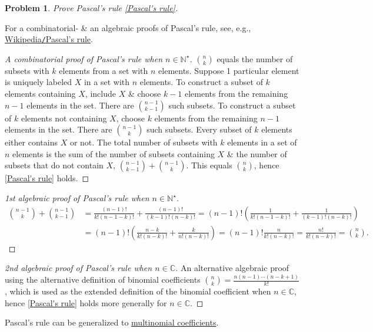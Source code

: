 \documentclass{article}
\newtheorem{problem}{Problem}
\begin{document}
\begin{problem}
	Prove Pascal's rule \eqref{Pascal's rule}.
\end{problem}
For a combinatorial- \& an algebraic proofs of Pascal's rule, see, e.g., \href{https://en.wikipedia.org/wiki/Pascal%27s_rule}{Wikipedia{\tt/}Pascal's rule}.

\begin{proof}[A combinatorial proof of Pascal's rule when $n\in\mathbb{N}^\star$]
	$\binom{n}{k}$ equals the number of subsets with $k$ elements from a set with $n$ elements. Suppose 1 particular element is uniquely labeled $X$ in a set with $n$ elements. To construct a subset of $k$ elements containing $X$, include $X$ \& choose $k - 1$ elements from the remaining $n - 1$ elements in the set. There are $\binom{n - 1}{k - 1}$ such subsets. To construct a subset of $k$ elements not containing $X$, choose $k$ elements from the remaining $n - 1$ elements in the set. There are $\binom{n - 1}{k}$ such subsets. Every subset of $k$ elements either contains $X$ or not. The total number of subsets with $k$ elements in a set of $n$ elements is the sum of the number of subsets containing $X$ \& the number of subsets that do not contain $X$, $\binom{n - 1}{k - 1} + \binom{n - 1}{k}$. This equals $\binom{n}{k}$, hence \eqref{Pascal's rule} holds.
\end{proof}

\begin{proof}[1st algebraic proof of Pascal's rule when $n\in\mathbb{N}^\star$]
	\begin{align*}
		\binom{n - 1}{k} + \binom{n - 1}{k - 1} &= \frac{(n - 1)!}{k!(n - 1 - k)!} + \frac{(n - 1)!}{(k - 1)!(n - k)!} = (n - 1)!\left(\frac{1}{k!(n - 1 - k)!} + \frac{1}{(k - 1)!(n - k)!}\right)\\
		&= (n - 1)!\left(\frac{n - k}{k!(n - k)!} + \frac{k}{n!(n - k)!}\right) = (n - 1)!\frac{n}{k!(n - k)!} = \frac{n!}{k!(n - k)!} = \binom{n}{k}.
	\end{align*}
\end{proof}

\begin{proof}[2nd algebraic proof of Pascal's rule when $n\in\mathbb{C}$]
	An alternative algebraic proof using the alternative definition of binomial coefficients $\binom{n}{k} = \frac{n(n - 1)\cdots(n - k + 1)}{k!}$, which is used as the extended definition of the binomial coefficient when $n\in\mathbb{C}$, hence \eqref{Pascal's rule} holds more generally for $n\in\mathbb{C}$.
\end{proof}
Pascal's rule can be generalized to \href{https://en.wikipedia.org/wiki/Multinomial_coefficient}{multinomial coefficients}.
\end{document}
